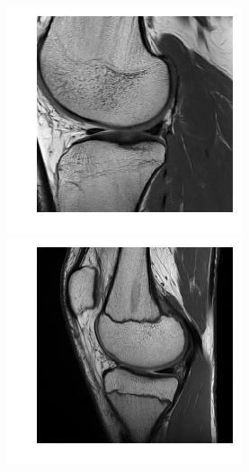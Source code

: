 \begin{figure}[H]
\endminipage\hfill
{}%
  \includegraphics[width=\linewidth]{imgs/transfer_pers_x3.png}
\endminipage\hfill
{}%
  \includegraphics[width=\linewidth]{imgs/transfer_pers_x4.png}
\endminipage
\vspace{0.15cm}

\end{figure}
